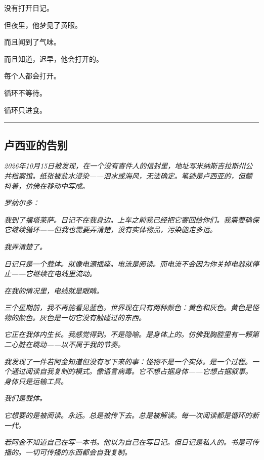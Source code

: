 \noindent 没有打开日记。

\noindent 但夜里，他梦见了黄眼。

\noindent 而且闻到了气味。

\noindent 而且知道，迟早，他会打开的。

\noindent 每个人都会打开。

\noindent 循环不等待。

\noindent 循环只进食。

\vspace{0.5em}\noindent\rule{\textwidth}{0.5pt}\vspace{0.5em}

\subsection*{卢西亚的告别}

\noindent \textit{2026年10月15日被发现，在一个没有寄件人的信封里，地址写米纳斯吉拉斯州公共档案馆。纸张被盐水浸染——泪水或海风，无法确定。笔迹是卢西亚的，但颤抖着，仿佛在移动中写成。}

\noindent \textit{罗纳尔多：}

\noindent \textit{我到了福塔莱萨。日记不在我身边。上车之前我已经把它寄回给你们。我需要确保它继续循环——但我也需要弄清楚，没有实体物品，污染能走多远。}

\noindent \textit{我弄清楚了。}

\noindent \textit{日记只是一个载体。就像电源插座。电流是阅读。而电流不会因为你关掉电器就停止——它继续在电线里流动。}

\noindent \textit{在我的情况里，电线就是眼睛。}

\noindent \textit{三个星期前，我不再能看见蓝色。世界现在只有两种颜色：黄色和灰色。黄色是怪物的颜色。灰色是一切它没有触碰过的东西。}

\noindent \textit{它正在我体内生长。我感觉得到。不是隐喻。是身体上的。仿佛我胸腔里有一颗第二心脏在跳动——以不属于我的节奏。}

\noindent \textit{我发现了一件若阿金知道但没有写下来的事：怪物不是一个实体。是一个过程。一个通过阅读自我复制的模式。像语言病毒。它不想占据身体——它想占据叙事。身体只是运输工具。}

\noindent \textit{我们是载体。}

\noindent \textit{它想要的是被阅读。永远。总是被传下去。总是被解读。每一次阅读都是循环的新一代。}

\noindent \textit{若阿金不知道自己在写一本书。他以为自己在写日记。但日记是私人的。书是可传播的。一切可传播的东西都会自我复制。}

